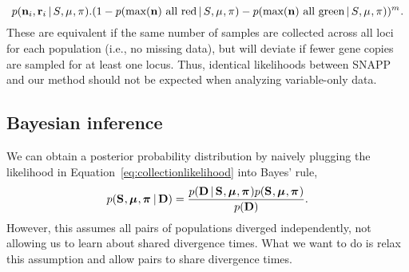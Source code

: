 \begin{linenomath}
\begin{equation}
{        \pr(\leafallelecounts[i], \leafredallelecounts[i] \given \sptree, \murate, \gfreq).
    }{
        (1 - \pr(\maxleafallelecounts \textrm{ all red} \given \sptree, \murate, \gfreq)
        - \pr(\maxleafallelecounts \textrm{ all green} \given \sptree, \murate, \gfreq))^{\nloci}
    }.
    \label{eq:snappvariablecomparisonlikelihood}
\end{equation}
These are equivalent if the same number of samples are collected across all
loci for each population (i.e., no missing data), but will deviate if fewer
gene copies are sampled for at least one locus.
Thus, identical likelihoods between SNAPP and our method should not be expected
when analyzing variable-only data.
\end{linenomath}

\subsection{Bayesian inference}

\begin{linenomath}
We can obtain a posterior probability distribution by naively plugging the
likelihood in Equation~\ref{eq:collectionlikelihood} into Bayes' rule,
\begin{equation}
    p(
    \mathbf{S}_{},
    \boldsymbol{\mu}_{},
    \boldsymbol{\pi}_{}
    \,|\,
    \mathbf{D}
    )
    =
    \frac{
        p(
        \mathbf{D}
        \,|\,
        \mathbf{S}_{}, \boldsymbol{\mu}_{}, \boldsymbol{\pi}_{}
        )
        p(
        \mathbf{S}_{},
        \boldsymbol{\mu}_{},
        \boldsymbol{\pi}_{}
        )
    }{
        p(
        \mathbf{D}
        )
    }.
    \label{eq:collectionindependentbayesrule}
\end{equation}
However, this assumes all pairs of populations diverged independently, not
allowing us to learn about shared divergence times.
What we want to do is relax this assumption and allow pairs to share divergence
times.
\end{linenomath}

